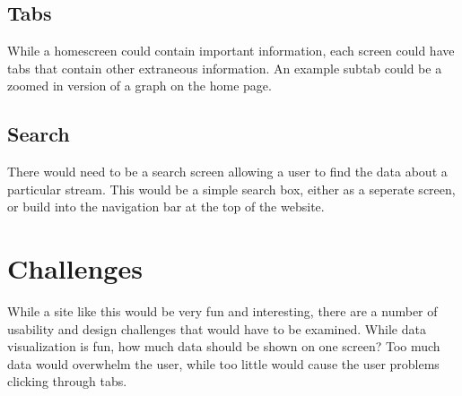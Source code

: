 \documentclass[10pt]{article}
\begin{document}
\subsection{Tabs}
While a homescreen could contain important information, each screen could have
tabs that contain other extraneous information. An example subtab could be
a zoomed in version of a graph on the home page. 

\subsection{Search}
There would need to be a search screen allowing a user to find the data about
a particular stream. This would be a simple search box, either as a seperate 
screen, or build into the navigation bar at the top of the website.

\section{Challenges}
While a site like this would be very fun and interesting, there are a number
of usability and design challenges that would have to be examined. While data
visualization is fun, how much data should be shown on one screen? Too much
data would overwhelm the user, while too little would cause the user problems
clicking through tabs. 
\end{document}
